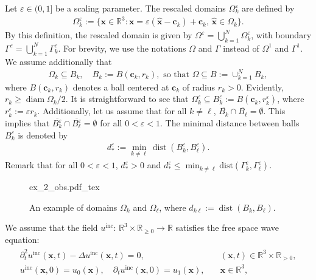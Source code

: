 \documentclass[]{article}
\numberwithin{equation}{section}
\numberwithin{theorem}{section}
\numberwithin{lemma}{section}
\numberwithin{corollary}{section}
\numberwithin{proposition}{section}
\numberwithin{definition}{section}
\newcommand{\re}{\varepsilon}
\begin{document}
	Let $ \re \in (0, 1] $ be a scaling parameter. The rescaled domains $ \Omega_k^{\re} $ are defined by
	\begin{align}
		\label{eq:rescaled_omega_k}
		\Omega^{\re}_k := \{ \boldsymbol{x} \in \mathbb{R}^3: \boldsymbol{x} = \re (\hat{\boldsymbol{x}} - \boldsymbol{c}_k) + \boldsymbol{c}_k, \,\hat{\boldsymbol{x}} \in \Omega_k \}.
	\end{align}
	By this definition, the rescaled domain is given by $ \Omega^{\re} = \bigcup_{k=1}^N \Omega_k^{\re} $, with boundary $ \Gamma^{\re} = \bigcup_{k=1}^N \Gamma_k^{\re} $. For brevity, we use the notations $\Omega$ and $\Gamma$ instead of $\Omega^1$ and $\Gamma^1$. We assume additionally that  
	\begin{align}
		\label{eq:omega_ball}
		\Omega_k \subseteq B_k, \quad B_k:=B(\boldsymbol{c}_k, r_k), \text{ so that }\Omega\subseteq B:=\cup_{k=1}^N B_k,
	\end{align}
	where $B(\boldsymbol{c}_k, r_k)$ denotes a ball centered at $\boldsymbol{c}_k$ of radius $r_k>0$. Evidently, $r_k\geq \operatorname{diam} \Omega_k/2$.  It is straightforward to see that $\Omega^{\re}_k \subseteq B^{\re}_k:= B(\boldsymbol{c}_k, r^{\re}_k)$, where $r^{\re}_k:=\re r_k$. 
	Additionally, let us assume that for all $k \neq \ell$,  $\overline{B_k} \cap \overline{B_{\ell}} = \emptyset$. This implies that $\overline{B_k^{\re}}  \cap \overline{B_{\ell}^{\re}}=\emptyset$ for all $0<\varepsilon<1$.  
	The minimal distance between balls $B_k^{\re}$ is denoted by
	\begin{align}
		\label{eq:min_distance}
		d_*^{\re}  := \min_{k \neq {\ell}} \operatorname{dist}(B_k^{\re}, B_{\ell}^{\re}).
	\end{align}
	Remark that for all $0<\re<1$, $d_*^{\re}>0$ and $d_*^{\re} \leq \min_{k\neq \ell} \text{dist}(\Gamma^{\re}_k, \Gamma^{\re}_{\ell})$.
	\begin{figure}[h]
		\centering
		\fontsize{10}{12}\selectfont 
		{ex_2_obs.pdf_tex}
		\caption{An example of domains $\Omega_k$ and $\Omega_{\ell}$, where $d_{k \ell} := \operatorname{dist}(B_k, B_{\ell})$.}
		\vspace{-15pt}
	\end{figure}
	We assume that the field $u^{\operatorname{inc}}: \,\mathbb{R}^3\times \mathbb{R}_{\geq 0}\rightarrow \mathbb{R}$ satisfies the free space wave equation:
	\begin{align}
		\label{eq:fsw}
		\begin{array}{ll}
			\partial^2_t u^{\operatorname{inc}}(\boldsymbol{x}, t) - \Delta u^{\operatorname{inc}}(\boldsymbol{x}, t) = 0, & \quad (\boldsymbol{x}, t) \in \mathbb{R}^3 \times \mathbb{R}_{>0}, \\
			u^{\operatorname{inc}}(\boldsymbol{x}, 0) = u_0(\boldsymbol{x}), \quad \partial_t u^{\operatorname{inc}}(\boldsymbol{x}, 0) = u_1(\boldsymbol{x}), & \quad \boldsymbol{x} \in \mathbb{R}^3,
		\end{array}
	\end{align}
\end{document}

